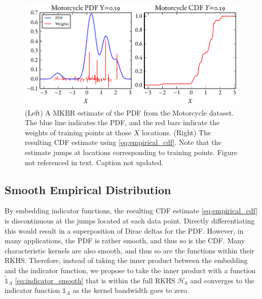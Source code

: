 \documentclass[twoside]{article} \usepackage{aistats2017}
\theoremstyle{definition}
\theoremstyle{remark}
\newcommand{\warn}[1]{{\color{RedOrange} #1}}
\begin{document}
		\begin{figure}
			\begin{center}
				\includegraphics[width=\columnwidth]{figures/cumulativeexampleragged}
			\end{center}
			\caption{\small (Left) A MKBR estimate of the PDF from the Motorcycle dataset. The blue line indicates the PDF, and the red bars indicate the weights of training points at those $X$ locations. (Right) The resulting CDF estimate using \eqref{eq:empirical_cdf}. Note that the estimate jumps at locations corresponding to training points. \warn{Figure not referenced in text. Caption not updated.}}
			\label{fig:cumulativeragged} 
		\end{figure}

	\subsection{Smooth Empirical Distribution}
	\label{sec:discriminative_quantile_regression:smooth_empirical_distribution}

		
		By embedding indicator functions, the resulting CDF estimate \eqref{eq:empirical_cdf} is discontinuous at the jumps located at each data point. Directly differentiating this would result in a superposition of Dirac deltas for the PDF. However, in many applications, the PDF is rather smooth, and thus so is the CDF. Many characteristic kernels are also smooth, and thus so are the functions within their RKHS. Therefore, instead of taking the inner product between the embedding and the indicator function, we propose to take the inner product with a function $\tilde{\mathbb{1}}_{A}$ \eqref{eq:indicator_smooth} that is within the full RKHS $\mathcal{H}_{k}$ and converges to the indicator function $\mathbb{1}_{A}$ as the kernel bandwidth goes to zero.
		
\end{document}

